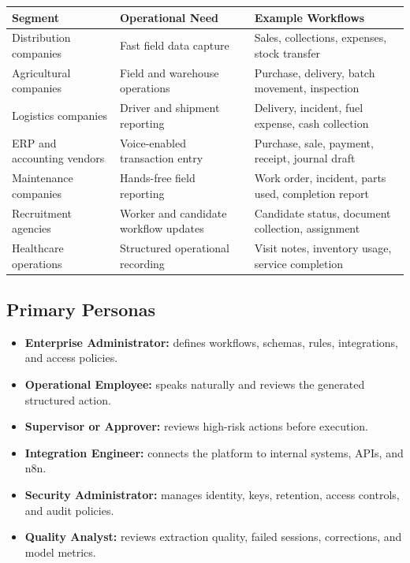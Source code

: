 \documentclass[11pt,a4paper]{article}
\begin{document}
\begin{tabularx}{\textwidth}{L{36mm}Y Y}
\toprule
\textbf{Segment} & \textbf{Operational Need} & \textbf{Example Workflows} \\
\midrule
Distribution companies
& Fast field data capture
& Sales, collections, expenses, stock transfer \\

Agricultural companies
& Field and warehouse operations
& Purchase, delivery, batch movement, inspection \\

Logistics companies
& Driver and shipment reporting
& Delivery, incident, fuel expense, cash collection \\

ERP and accounting vendors
& Voice-enabled transaction entry
& Purchase, sale, payment, receipt, journal draft \\

Maintenance companies
& Hands-free field reporting
& Work order, incident, parts used, completion report \\

Recruitment agencies
& Worker and candidate workflow updates
& Candidate status, document collection, assignment \\

Healthcare operations
& Structured operational recording
& Visit notes, inventory usage, service completion \\
\bottomrule
\end{tabularx}

\subsection{Primary Personas}

\begin{itemize}
\item \textbf{Enterprise Administrator:}
defines workflows, schemas, rules, integrations, and access policies.

\item \textbf{Operational Employee:}
speaks naturally and reviews the generated structured action.

\item \textbf{Supervisor or Approver:}
reviews high-risk actions before execution.

\item \textbf{Integration Engineer:}
connects the platform to internal systems, APIs, and n8n.

\item \textbf{Security Administrator:}
manages identity, keys, retention, access controls, and audit policies.

\item \textbf{Quality Analyst:}
reviews extraction quality, failed sessions, corrections, and model metrics.
\end{itemize}
\end{document}
